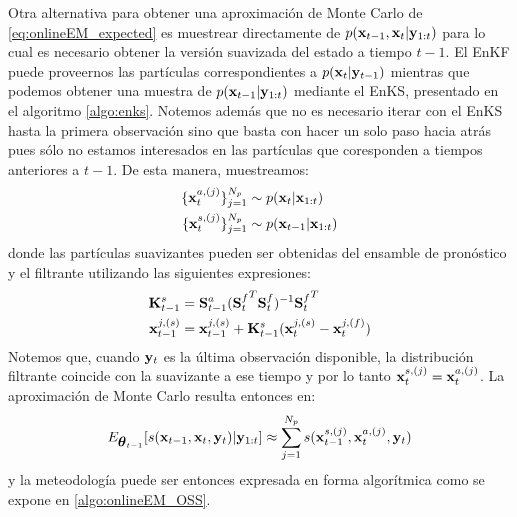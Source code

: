 Otra alternativa para obtener una aproximación de Monte Carlo de \ref{eq:onlineEM_expected} es muestrear directamente de $p(\mathbf{x}_{t-1}, \mathbf{x}_t| \mathbf{y}_{1:t})$ para lo cual es necesario obtener la versión suavizada del estado a tiempo $t-1$. El EnKF puede proveernos las partículas correspondientes a $p(\mathbf{x}_t | \mathbf{y}_{t-1})$ mientras que podemos obtener una muestra de $p(\mathbf{x}_{t-1} | \mathbf{y}_{1:t})$ mediante el EnKS, presentado en el algoritmo \ref{algo:enks}. Notemos además que no es necesario iterar con el EnKS hasta la primera observación sino que basta con hacer un solo paso hacia atrás pues sólo no estamos interesados en las partículas que coresponden a tiempos anteriores a $t-1$. De esta manera, muestreamos:
\begin{align*}
    \{\mathbf{x}_t^{a, (j)}\}_{j=1}^{N_p} &\sim p(\mathbf{x}_t | \mathbf{x}_{1:t}) \\
    \{\mathbf{x}_t^{s, (j)}\}_{j=1}^{N_p} &\sim p(\mathbf{x}_{t-1} | \mathbf{x}_{1:t})
\end{align*}
donde las partículas suavizantes pueden ser obtenidas del ensamble de pronóstico y el filtrante utilizando las siguientes expresiones:
\begin{align*}
    \mathbf{K}_{t-1}^s &= \mathbf{S}_{t-1}^a ( {\mathbf{S}_t^f}^T \mathbf{S}_t^f )^{-1} {\mathbf{S}_t^f}^T \\
    \mathbf{x}_{t-1}^{j, (s)} &= \mathbf{x}_{t-1}^{j, (s)} + \mathbf{K}_{t-1}^s (\mathbf{x}_t^{j, (s)} - \mathbf{x}_t^{j, (f)})
\end{align*}
Notemos que, cuando $\mathbf{y}_t$ es la última observación disponible, la distribución filtrante coincide con la suavizante a ese tiempo y por lo tanto $\mathbf{x}_t^{s, (j)} = \mathbf{x}_t^{a, (j)}$. La aproximación de Monte Carlo resulta entonces en:
\begin{align*}
    E_{\mbox{\boldmath$ \theta $}_{t-1}} [s(\mathbf{x}_{t-1}, \mathbf{x}_t, \mathbf{y}_t) | \mathbf{y}_{1:t}] \approx \sum_{j=1}^{N_p} s(\mathbf{x}_{t-1}^{s, (j)}, \mathbf{x}_{t}^{a, (j)}, \mathbf{y}_t)
\end{align*}
y la meteodología puede ser entonces expresada en forma algorítmica como se expone en \ref{algo:onlineEM_OSS}.

